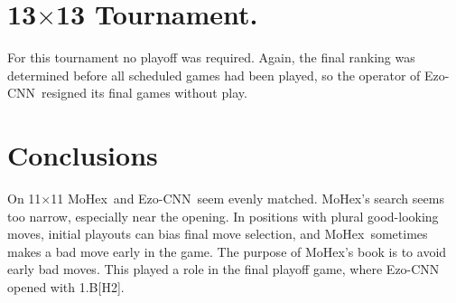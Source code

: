 \documentclass{IOS-Book-Article}
\def\Ec{\mbox{\sc Ezo-CNN}}
\def\Mx{\mbox{\sc MoHex}}
\def\Mc{\mbox{\sc MoHex-CNN}}
\begin{document}
\section{13$\times$13 Tournament.}
For this tournament no playoff was required.
Again, the final ranking was determined before
all scheduled games had been played,
so the operator of \Ec\  resigned its final games
without play.


\section{Conclusions}
On 11$\times$11 \Mx\ and \Ec\ seem evenly matched.
\Mx{}'s search seems too narrow, especially near the opening.
In positions with plural good-looking moves,
initial playouts can bias final move selection, and
\Mx\ sometimes makes a bad move early in the game.
The purpose of \Mx's book is to avoid early bad moves.
This played a role in the final playoff game, 
where \Ec{} opened with 1.B[H2].  

%
\end{document}
